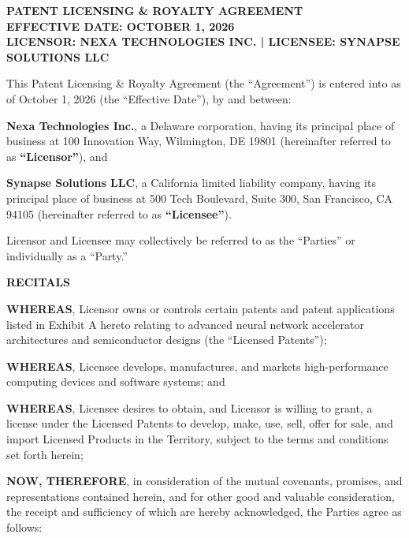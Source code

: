 \thispagestyle{firstpage}

\begin{tcolorbox}[
  colback=legalbg,
  colframe=legalnavy,
  arc=0mm,
  leftrule=5pt,
  rightrule=0pt,
  toprule=0pt,
  bottomrule=0pt,
  boxsep=12pt,
  left=15pt,
  right=15pt,
  top=15pt,
  bottom=15pt
]
  {\fontsize{20}{24}\selectfont\color{legalnavy}\sffamily\bfseries PATENT LICENSING \& ROYALTY AGREEMENT}\\[8pt]
  {\fontsize{10}{14}\selectfont\color{legalslate}\sffamily\bfseries EFFECTIVE DATE: OCTOBER 1, 2026}\\[4pt]
  {\fontsize{9}{12}\selectfont\color{legalgold}\sffamily\bfseries LICENSOR: NEXA TECHNOLOGIES INC. \quad | \quad LICENSEE: SYNAPSE SOLUTIONS LLC}
\end{tcolorbox}

\vspace{1.5em}

This Patent Licensing \& Royalty Agreement (the ``Agreement'') is entered into as of October 1, 2026 (the ``Effective Date''), by and between:

\textbf{Nexa Technologies Inc.}, a Delaware corporation, having its principal place of business at 100 Innovation Way, Wilmington, DE 19801 (hereinafter referred to as \textbf{``Licensor''}), and

\textbf{Synapse Solutions LLC}, a California limited liability company, having its principal place of business at 500 Tech Boulevard, Suite 300, San Francisco, CA 94105 (hereinafter referred to as \textbf{``Licensee''}).

Licensor and Licensee may collectively be referred to as the ``Parties'' or individually as a ``Party.''

\vspace{1.0em}
\centerline{\textbf{RECITALS}}
\vspace{0.5em}

\textbf{WHEREAS}, Licensor owns or controls certain patents and patent applications listed in Exhibit A hereto relating to advanced neural network accelerator architectures and semiconductor designs (the ``Licensed Patents'');

\textbf{WHEREAS}, Licensee develops, manufactures, and markets high-performance computing devices and software systems; and

\textbf{WHEREAS}, Licensee desires to obtain, and Licensor is willing to grant, a license under the Licensed Patents to develop, make, use, sell, offer for sale, and import Licensed Products in the Territory, subject to the terms and conditions set forth herein;

\textbf{NOW, THEREFORE}, in consideration of the mutual covenants, promises, and representations contained herein, and for other good and valuable consideration, the receipt and sufficiency of which are hereby acknowledged, the Parties agree as follows:
